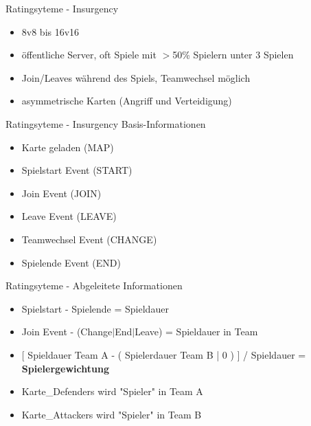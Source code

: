 \documentclass{beamer}
\begin{document}
\begin{frame}{Ratingsyteme - Insurgency}
\begin{itemize}
\item 8v8 bis 16v16
\pause
\item öffentliche Server, oft Spiele mit $>$50\% Spielern unter 3 Spielen
\pause
\item Join/Leaves während des Spiels, Teamwechsel möglich
\pause
\item asymmetrische Karten (Angriff und Verteidigung)
\end{itemize}
\end{frame}

\begin{frame}{Ratingsyteme - Insurgency Basis-Informationen}
\begin{itemize}
\item Karte geladen (MAP)
\item Spielstart Event (START)
\item Join Event (JOIN)
\item Leave Event (LEAVE)
\item Teamwechsel Event (CHANGE)
\item Spielende Event (END)
\end{itemize}
\end{frame}

\begin{frame}{Ratingsyteme - Abgeleitete Informationen}
\begin{itemize}
\item Spielstart - Spielende = Spieldauer
\item Join Event - (Change$|$End$|$Leave) = Spieldauer in Team
\item $[$ Spieldauer Team A - ( Spielerdauer Team B | 0 ) $]$ / Spieldauer = \textbf{Spielergewichtung}
\item Karte\_Defenders wird "Spieler" in Team A
\item Karte\_Attackers wird "Spieler" in Team B
\end{itemize}
\end{frame}
\end{document}

